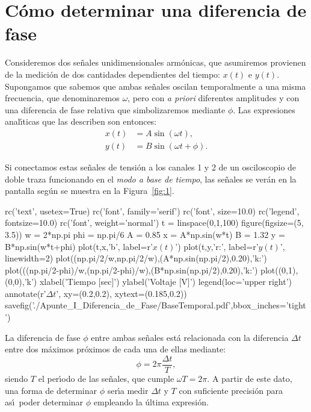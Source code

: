 \documentclass[laboratorio]{guia}
\begin{document}
 
\maketitle

\section{C\'omo determinar una diferencia de fase}

Consideremos dos se\~nales unidimensionales arm\'onicas, que asumiremos
provienen de la medici\'on de dos cantidades dependientes del tiempo: $x(t)$ e
$y(t)$. Supongamos que sabemos que ambas se\~nales oscilan temporalmente a una
misma frecuencia, que denominaremos $\omega$, pero con {\it a priori}
diferentes amplitudes y con una diferencia de fase relativa que simbolizaremos
mediante $\phi$. Las expresiones anal\'\i ticas que las describen son entonces:
\begin{align}
    x(t) &= A \sin \left(\omega t\right), \\
    y(t) &= B \sin \left(\omega t + \phi \right).
\end{align}

Si conectamos estas se\~nales de tensi\'on a los canales 1 y 2 de un osciloscopio de doble
traza funcionando en el {\it modo a base de tiempo}, las se\~nales se ver\'an
en la pantalla seg\'un se muestra en la Figura~\ref{fig:1}. 


\begin{pylabcode}
rc('text', usetex=True)
rc('font', family='serif')
rc('font', size=10.0)
rc('legend', fontsize=10.0)
rc('font', weight='normal')
t = linspace(0,1,100)
figure(figsize=(5, 3.5))
w = 2*np.pi
phi = np.pi/6
A = 0.85
x = A*np.sin(w*t)
B = 1.32
y = B*np.sin(w*t+phi)
plot(t,x,'b', label=r'$x(t)$')
plot(t,y,'r:', label=r'$y(t)$', linewidth=2)
plot((np.pi/2/w,np.pi/2/w),(A*np.sin(np.pi/2),0.20),'k:')
plot(((np.pi/2-phi)/w,(np.pi/2-phi)/w),(B*np.sin(np.pi/2),0.20),'k:')
plot((0,1),(0,0),'k')
xlabel('Tiempo [sec]')
ylabel('Voltaje [V]')
legend(loc='upper right')
annotate(r'$\Delta t$', xy=(0.2,0.2), xytext=(0.185,0.2)) 
savefig('./Apunte_I_Diferencia_de_Fase/BaseTemporal.pdf',bbox_inches='tight')
\end{pylabcode}

La diferencia de fase $\phi$ entre ambas se\~nales est\'a relacionada con la
diferencia $\Delta t$ entre dos m\'aximos pr\'oximos de cada una de ellas
mediante:
\begin{equation}
    \phi = 2\pi \frac{\Delta t}{T},
\end{equation}
siendo $T$ el per\'\i odo de las se\~nales, que cumple $\omega T = 2\pi$. A
partir de este dato, una forma de determinar $\phi$ ser\'\i a medir $\Delta t$
y $T$ con suficiente precisi\'on para as\'\i\  poder determinar $\phi$
empleando la \'ultima expresi\'on. 
\end{document}
